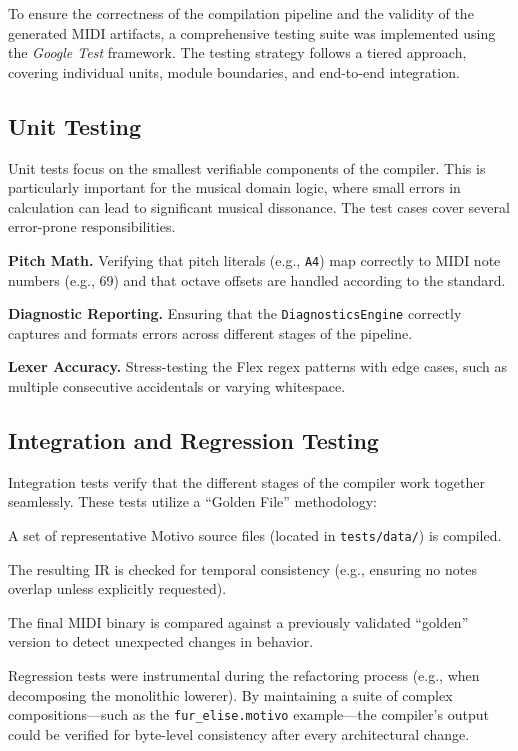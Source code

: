 To ensure the correctness of the compilation pipeline and the validity of the generated MIDI artifacts, a comprehensive
testing suite was implemented using the \textit{Google Test} framework.
The testing strategy follows a tiered approach, covering individual units, module boundaries, and end-to-end
integration.

\subsection{Unit Testing}\label{detail-subsec:unit-testing}

Unit tests focus on the smallest verifiable components of the compiler.
This is particularly important for the musical domain logic, where small errors in calculation can lead to significant
musical dissonance.
The test cases cover several error-prone responsibilities.

\noindent \textbf{Pitch Math.} Verifying that pitch literals (e.g., \texttt{A4}) map correctly to MIDI note
numbers (e.g.,
69) and that octave offsets are handled according to the standard.

\noindent \textbf{Diagnostic Reporting.} Ensuring that the \texttt{DiagnosticsEngine} correctly captures and formats
errors across different stages of the pipeline.

\noindent \textbf{Lexer Accuracy.} Stress-testing the Flex regex patterns with edge cases, such as multiple consecutive
accidentals or varying whitespace.

\subsection{Integration and Regression Testing}\label{detail-subsec:integration-and-regression-testing}

Integration tests verify that the different stages of the compiler work together seamlessly.
These tests utilize a ``Golden File'' methodology:

\noindent A set of representative Motivo source files (located in \texttt{tests/data/}) is compiled.

\noindent The resulting IR is checked for temporal consistency (e.g., ensuring no notes overlap unless explicitly
requested).

\noindent The final MIDI binary is compared against a previously validated ``golden'' version to detect
unexpected changes
in behavior.

Regression tests were instrumental during the refactoring process (e.g., when decomposing the monolithic lowerer).
By maintaining a suite of complex compositions---such as the \texttt{fur\_elise.motivo} example---the compiler's
output could be
verified for byte-level consistency after every architectural change.

